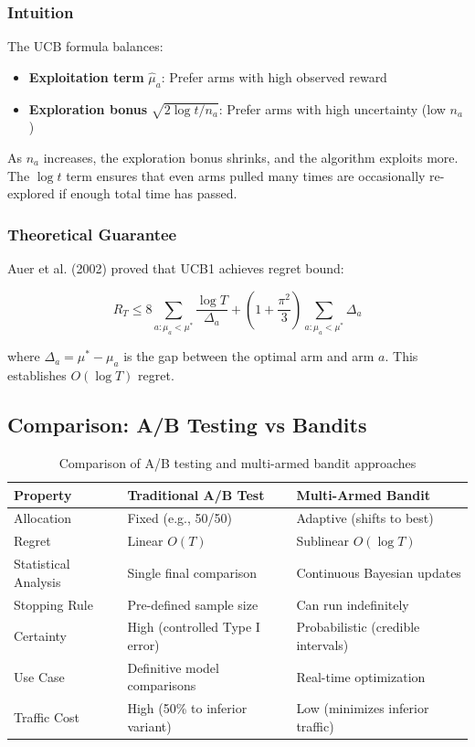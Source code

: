 \subsubsection{Intuition}

The UCB formula balances:
\begin{itemize}
    \item \textbf{Exploitation term} $\hat{\mu}_a$: Prefer arms with high observed reward
    \item \textbf{Exploration bonus} $\sqrt{2 \log t / n_a}$: Prefer arms with high uncertainty (low $n_a$)
\end{itemize}

As $n_a$ increases, the exploration bonus shrinks, and the algorithm exploits more. The $\log t$ term ensures that even arms pulled many times are occasionally re-explored if enough total time has passed.

\subsubsection{Theoretical Guarantee}

Auer et al. (2002) proved that UCB1 achieves regret bound:

\begin{equation}
R_T \leq 8 \sum_{a: \mu_a < \mu^*} \frac{\log T}{\Delta_a} + \left(1 + \frac{\pi^2}{3}\right) \sum_{a: \mu_a < \mu^*} \Delta_a
\end{equation}

where $\Delta_a = \mu^* - \mu_a$ is the gap between the optimal arm and arm $a$. This establishes $O(\log T)$ regret.

\subsection{Comparison: A/B Testing vs Bandits}

\begin{table}[h]
\centering
\begin{tabular}{lll}
\toprule
\textbf{Property} & \textbf{Traditional A/B Test} & \textbf{Multi-Armed Bandit} \\
\midrule
Allocation & Fixed (e.g., 50/50) & Adaptive (shifts to best) \\
Regret & Linear $O(T)$ & Sublinear $O(\log T)$ \\
Statistical Analysis & Single final comparison & Continuous Bayesian updates \\
Stopping Rule & Pre-defined sample size & Can run indefinitely \\
Certainty & High (controlled Type I error) & Probabilistic (credible intervals) \\
Use Case & Definitive model comparisons & Real-time optimization \\
Traffic Cost & High (50\% to inferior variant) & Low (minimizes inferior traffic) \\
\bottomrule
\end{tabular}
\caption{Comparison of A/B testing and multi-armed bandit approaches}
\end{table}

